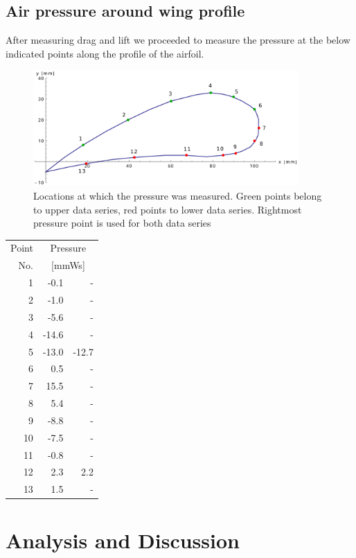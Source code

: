 \documentclass{scrreprt}
\begin{document}
\subsection{Air pressure around wing profile}
After measuring drag and lift we proceeded to measure the pressure at the below indicated points along the profile of the airfoil.
\begin{figure}[H]
	\centering
  \includegraphics[width=0.9\textwidth]{diag/pressure_points.pdf}
	\caption{Locations at which the pressure was measured. Green points belong to upper data series, red points to lower data series. Rightmost pressure point is used for both data series}
	\label{fig:prespoints}
\end{figure}

\begin{table}[H]
\centering
\begin{tabular}{|r|r|r|}
\hline
Point & \multicolumn{2}{c|}{Pressure}\\
No. &  \multicolumn{2}{c|}{[mmWs]} \\
\hline\hline
1 & -0.1 & -\\
2 & -1.0 & -\\
3 & -5.6 & -\\
4 & -14.6 & -\\
5 & -13.0 & -12.7 \\
6 & 0.5 & -\\
\hline
7 & 15.5 & -\\
\hline
8 & 5.4 & -\\
9 & -8.8 & -\\
10 & -7.5 & -\\
11 & -0.8 & -\\
12 & 2.3 & 2.2\\
13 & 1.5 & -\\
\hline
\end{tabular}
\end{table}

\section{Analysis and Discussion}
\end{document}
